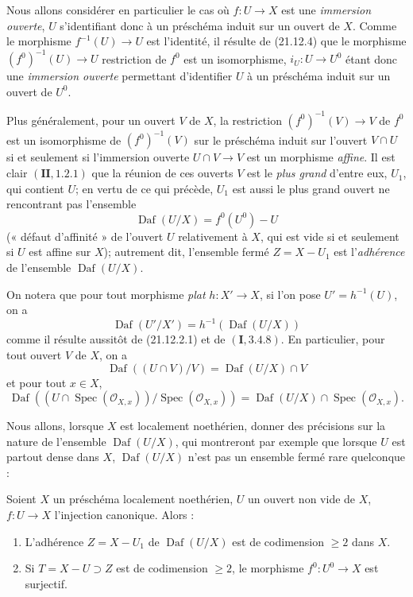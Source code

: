 \begin{env}[21.12.5]
Nous allons considérer en particulier le cas où $f:U\to X$ est une \emph{immersion
ouverte}, $U$ s'identifiant donc à un préschéma induit sur un ouvert de $X$. Comme le
morphisme $f^{-1}(U)\to U$ est l'identité, il résulte de (21.12.4) que le morphisme
$(f^0)^{-1}(U)\to U$ restriction de $f^0$ est un isomorphisme, $i_U:U\to U^0$ étant
donc une \emph{immersion ouverte} permettant d'identifier $U$ à un préschéma induit
sur un ouvert de $U^0$.

Plus généralement, pour un ouvert $V$ de $X$, la restriction $(f^0)^{-1}(V)\to V$ de
$f^0$ est un isomorphisme de $(f^0)^{-1}(V)$ sur le préschéma induit sur l'ouvert
$V\cap U$ si et seulement si l'immersion ouverte $U\cap V\to V$ est un morphisme
\emph{affine}. Il est clair $(\mathbf{II}, 1.2.1)$
que la réunion de ces ouverts $V$ est le \emph{plus grand} d'entre eux, $U_1$, qui
contient $U$; en vertu de ce qui précède, $U_1$ est aussi le plus grand ouvert ne
rencontrant pas l'ensemble
\[
  \operatorname{Daf}(U/X)=f^0(U^0)-U
\]
(« défaut d'affinité » de l'ouvert $U$ relativement à $X$, qui est vide si et seulement
si $U$ est affine sur $X$); autrement dit, l'ensemble fermé $Z=X-U_1$ est
l'\emph{adhérence} de l'ensemble $\operatorname{Daf}(U/X)$.

On notera que pour tout morphisme \emph{plat} $h:X'\to X$, si l'on pose
$U'=h^{-1}(U)$, on a
\[
\label{IV.21.12.5.1}
  \operatorname{Daf}(U'/X')=h^{-1}(\operatorname{Daf}(U/X))
  \tag{21.12.5.1}
\]
comme il résulte aussitôt de (21.12.2.1) et de $(\mathbf I, 3.4.8)$. En particulier,
pour tout ouvert $V$ de $X$, on a
\[
\label{IV.21.12.5.2}
  \operatorname{Daf}((U\cap V)/V)=\operatorname{Daf}(U/X)\cap V
  \tag{21.12.5.2}
\]
et pour tout $x\in X$,
\[
\label{IV.21.12.5.3}
  \operatorname{Daf}((U\cap\operatorname{Spec}(\mathcal O_{X,x}))
  /\operatorname{Spec}(\mathcal O_{X,x}))
  =\operatorname{Daf}(U/X)\cap\operatorname{Spec}(\mathcal O_{X,x}).
  \tag{21.12.5.3}
\]
\end{env}

Nous allons, lorsque $X$ est localement noethérien, donner des précisions sur la nature
de l'ensemble $\operatorname{Daf}(U/X)$, qui montreront par exemple que lorsque $U$ est
partout dense dans $X$, $\operatorname{Daf}(U/X)$ n'est pas un ensemble fermé rare
quelconque :

\begin{theorem}[21.12.6]
\label{IV.21.12.6}
Soient $X$ un préschéma localement noethérien, $U$ un ouvert non vide de $X$,
$f:U\to X$ l'injection canonique. Alors :
\begin{enumerate}[label=(\roman*)]
  \item L'adhérence $Z=X-U_1$ de $\operatorname{Daf}(U/X)$ est de codimension
  $\geq2$ dans $X$.
  \item Si $T=X-U\supset Z$ est de codimension $\geq2$, le morphisme
  $f^0:U^0\to X$ est surjectif.
\end{enumerate}
\end{theorem}

